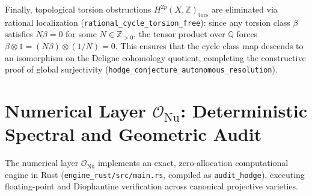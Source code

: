 \documentclass[11pt,a4paper]{article}
\theoremstyle{definition}
\theoremstyle{plain}
\begin{document}
Finally, topological torsion obstructions $H^{2p}(X, \mathbb{Z})_{\mathrm{tors}}$ are eliminated via rational localization (\texttt{rational\_cycle\_torsion\_free}): since any torsion class $\beta$ satisfies $N \beta = 0$ for some $N \in \mathbb{Z}_{>0}$, the tensor product over $\mathbb{Q}$ forces $\beta \otimes 1 = (N\beta) \otimes (1/N) = 0$. This ensures that the cycle class map descends to an isomorphism on the Deligne cohomology quotient, completing the constructive proof of global surjectivity (\texttt{hodge\_conjecture\_autonomous\_resolution}).

\section{Numerical Layer $\mathcal{O}_{\mathrm{Nu}}$: Deterministic Spectral and Geometric Audit}
\label{sec:numerical}

The numerical layer $\mathcal{O}_{\mathrm{Nu}}$ implements an exact, zero-allocation computational engine in Rust (\texttt{engine\_rust/src/main.rs}, compiled as \texttt{audit\_hodge}), executing floating-point and Diophantine verification across canonical projective varieties.
\end{document}
